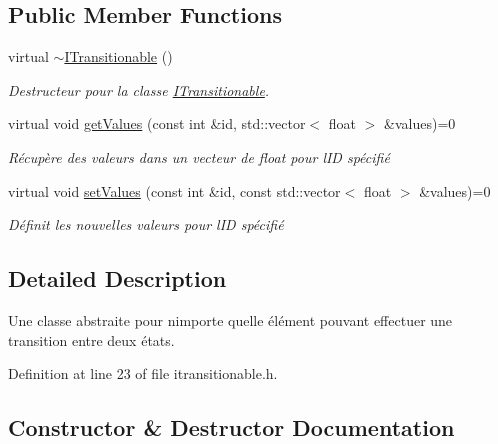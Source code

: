 \subsection*{Public Member Functions}
\begin{DoxyCompactItemize}
\item 
virtual \hyperlink{classns_transition_1_1_i_transitionable_addd11ff845b6387b07672a64c1b8938e}{$\sim$\+I\+Transitionable} ()
\begin{DoxyCompactList}\small\item\em Destructeur pour la classe \hyperlink{classns_transition_1_1_i_transitionable}{I\+Transitionable}. \end{DoxyCompactList}\item 
virtual void \hyperlink{classns_transition_1_1_i_transitionable_a5871a16fd47c1e5c8bacdd5da8597ed9}{get\+Values} (const int \&id, std\+::vector$<$ float $>$ \&values)=0
\begin{DoxyCompactList}\small\item\em Récupère des valeurs dans un vecteur de float pour l\textquotesingle{}ID spécifié \end{DoxyCompactList}\item 
virtual void \hyperlink{classns_transition_1_1_i_transitionable_ade37d29f7f2ca4890ed0e2e64d033197}{set\+Values} (const int \&id, const std\+::vector$<$ float $>$ \&values)=0
\begin{DoxyCompactList}\small\item\em Définit les nouvelles valeurs pour l\textquotesingle{}ID spécifié \end{DoxyCompactList}\end{DoxyCompactItemize}


\subsection{Detailed Description}
Une classe abstraite pour n\textquotesingle{}importe quelle élément pouvant effectuer une transition entre deux états. 

Definition at line 23 of file itransitionable.\+h.



\subsection{Constructor \& Destructor Documentation}
\mbox{\label{classns_transition_1_1_i_transitionable_addd11ff845b6387b07672a64c1b8938e}} 
